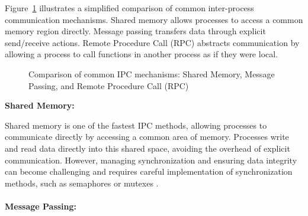 Figure~\ref{fig:ipc_methods} illustrates a simplified comparison of common inter-process communication mechanisms. Shared memory allows processes to access a common memory region directly. Message passing transfers data through explicit send/receive actions. Remote Procedure Call (RPC) abstracts communication by allowing a process to call functions in another process as if they were local.

\begin{figure}[H]
	\centering
	\caption{Comparison of common IPC mechanisms: Shared Memory, Message Passing, and Remote Procedure Call (RPC)}
	\label{fig:ipc_methods}
\end{figure}


\textbf{Shared Memory:}

Shared memory is one of the fastest IPC methods, allowing processes to communicate directly by accessing a common area of memory. Processes write and read data directly into this shared space, avoiding the overhead of explicit communication. However, managing synchronization and ensuring data integrity can become challenging and requires careful implementation of synchronization methods, such as semaphores or mutexes \cite{stallings2018, ipc_performance_analysis}.
\\
\\
\textbf{Message Passing:}

